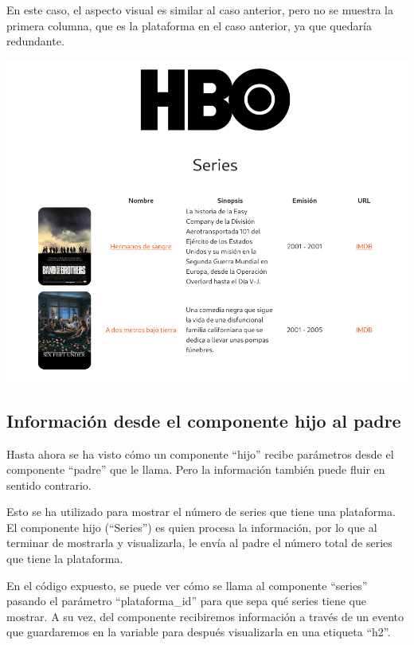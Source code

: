 \documentclass{\ClassPath/viu-tfm-template}
\begin{document}
\begin{itemize}
    En este caso, el aspecto visual es similar al caso anterior, pero no se muestra la primera columna, que es la plataforma en el caso anterior, ya que quedaría redundante.

    \vspace{-0.2em}
    \begin{center}
        \includegraphics[frame,width=0.7\linewidth]{img/series-3.png}
    \end{center}
\end{itemize}


\subsection{Información desde el componente hijo al padre}
Hasta ahora se ha visto cómo un componente “hijo” recibe parámetros desde el componente “padre” que le llama. Pero la información también puede fluir en sentido contrario.

Esto se ha utilizado para mostrar el número de series que tiene una plataforma. El componente hijo (“Series”) es quien procesa la información, por lo que al terminar de mostrarla y visualizarla, le envía al padre el número total de series que tiene la plataforma.


En el código expuesto, se puede ver cómo se llama al componente “series” pasando el parámetro “plataforma\_id” para que sepa qué series tiene que mostrar. A su vez, del componente recibiremos información a través de un evento que guardaremos en la variable  para después visualizarla en una etiqueta “h2”.
\end{document}
